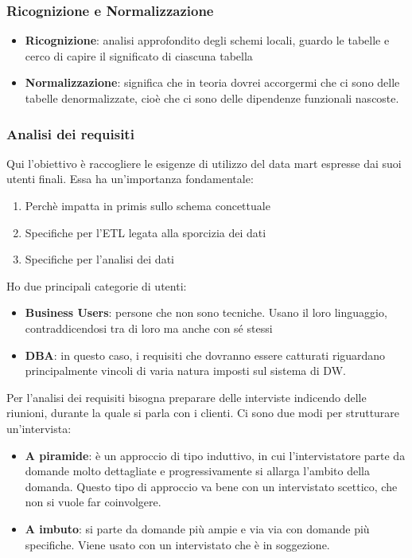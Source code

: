 \subsubsection{Ricognizione e Normalizzazione}
\begin{itemize}
	\item
	\textbf{Ricognizione}: analisi approfondito degli schemi locali, guardo le tabelle e cerco di capire il significato di ciascuna tabella
	\item 
	\textbf{Normalizzazione}: significa che in teoria dovrei accorgermi che ci sono delle tabelle denormalizzate, cioè che ci sono delle dipendenze funzionali nascoste. 
\end{itemize}

\subsubsection{Analisi dei requisiti}
Qui l’obiettivo è raccogliere le esigenze di utilizzo del data mart espresse dai suoi utenti finali. Essa ha un’importanza fondamentale:
\begin{enumerate}
	\item 
	Perchè impatta in primis sullo schema concettuale
	\item 
	Specifiche per l'ETL legata alla sporcizia dei dati
	\item 
	Specifiche per l'analisi dei dati
\end{enumerate}
Ho due principali categorie di utenti:
\begin{itemize}
	\item 
	\textbf{Business Users}: persone che non sono tecniche. Usano il loro linguaggio, contraddicendosi tra di loro ma anche con sé stessi
	\item 
	\textbf{DBA}: in questo caso, i requisiti che dovranno essere catturati riguardano principalmente vincoli di varia natura imposti sul sistema di DW.
\end{itemize}
Per l’analisi dei requisiti bisogna preparare delle interviste indicendo delle riunioni, durante la quale si parla con i clienti. Ci sono due modi per strutturare un’intervista:
\begin{itemize}
	\item 
	\textbf{A piramide}: è un approccio di tipo induttivo, in cui l’intervistatore parte da domande molto dettagliate e progressivamente si allarga l’ambito della domanda. Questo tipo di approccio va bene con un intervistato scettico, che non si vuole far coinvolgere.
	\item
	\textbf{A imbuto}: si parte da domande più ampie e via via con domande più specifiche. Viene usato con un intervistato che è in soggezione. 
\end{itemize}
